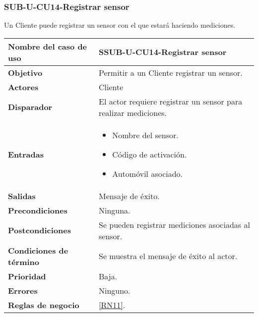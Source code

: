 \subsubsection{SUB-U-CU14-Registrar sensor}\label{SUB-U-CU14}
Un Cliente puede registrar un sensor con el que estará haciendo mediciones.

\begin{longtable}{|J{5cm}|J{10.3cm}|}
	\hline
	\textbf{Nombre del caso de uso} &
		SSUB-U-CU14-Registrar sensor \\ \hline
	\textbf{Objetivo} &
		Permitir a un Cliente registrar un sensor. \\ \hline
	\textbf{Actores} &
		Cliente \\ \hline 
	\textbf{Disparador} & 
		El actor requiere registrar un sensor para realizar mediciones. \\ \hline 
	\textbf{Entradas} & 
		\begin{itemize}
				\item Nombre del sensor.
				\item Código de activación.
				\item Automóvil asociado.
		\end{itemize}\\ \hline 
	\textbf{Salidas} & Mensaje de éxito.
		\\ \hline
	\textbf{Precondiciones} & Ninguna.
		\\ \hline
	\textbf{Postcondiciones} & Se pueden registrar mediciones asociadas al sensor.
		\\ \hline
	\textbf{Condiciones de término} & Se muestra el mensaje de éxito al actor.
		\\ \hline 
	\textbf{Prioridad} & 
		Baja. \\ \hline
	\textbf{Errores} & Ninguno.
		\\ \hline
	\textbf{Reglas de negocio} & \ref{RN11}.
		 \\ \hline
\end{longtable}


